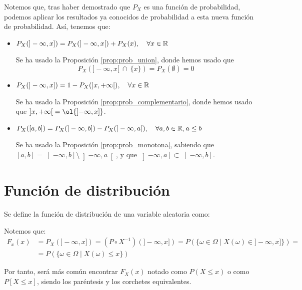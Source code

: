 Notemos que, tras haber demostrado que $P_X$ es una función de probabilidad,
podemos aplicar los resultados ya conocidos de probabilidad a esta nueva función de probabilidad. Así, tenemos que:
\begin{itemize}
    \item $P_X(]-\infty, x]) = P_X(]-\infty, x[) + P_X(x), \quad \forall x \in \mathbb R$
    
    Se ha usado la Proposición \ref{prop:prob_union}, donde hemos usado que $$P_X(]-\infty, x[~\cap ~\{x\}) = P_X(\emptyset) = 0$$

    \item $P_X(]-\infty, x]) = 1 - P_X(]x, +\infty[), \quad \forall x \in \mathbb R$
    
    Se ha usado la Proposición \ref{prop:prob_complementario}, donde hemos usado que $\left]x, +\infty\right[ = \ol{\left]-\infty, x\right]}$.

    \item $P_X([a,b]) = P_X(]-\infty, b]) - P_X(]-\infty, a[), \quad \forall a,b \in \mathbb R, a \leq b$
    
    Se ha usado la Proposición \ref{prop:prob_monotona}, sabiendo que $[a,b] = \left]-\infty, b\right] \setminus \left]-\infty, a\right[$, y que $\left]-\infty, a\right]\subset \left]-\infty, b\right]$.
    
\end{itemize}

\section{Función de distribución}
\begin{definicion}
Se define la función de distribución de una variable aleatoria como:
\Func{F_X}{\R}{[0,1]}{x}{P_X\left(]-\infty, x]\right)}
\end{definicion}
\begin{notacion}
Notemos que:
\begin{align*}
    F_x(x) &= P_X(]-\infty, x]) = (P \circ X^{-1})(]-\infty, x]) = P(\{\omega \in \Omega \mid X(\omega) \in ]-\infty, x] \}) =\\
    &=P(\{\omega \in \Omega \mid X(\omega) \leq x\})
\end{align*}

Por tanto, será más común encontrar $F_X(x)$ notado como $P(X \leq x)$ o como $P[X \leq x]$, siendo los paréntesis y los corchetes equivalentes.
\end{notacion}

